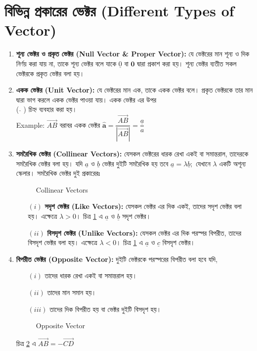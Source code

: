 \section*{বিভিন্ন প্রকারের ভেক্টর (Different Types of Vector)}
\begin{enumerate}
	\item \textbf{শূন্য ভেক্টর ও প্রকৃত ভেক্টর (Null Vector \& Proper Vector):} যে ভেক্টরের মান শূন্য ও দিক নির্ণয় করা যায় না, তাকে শূন্য ভেক্টর বলে যাকে $\underline{0}$ বা $\mathbf{0}$ দ্বারা প্রকাশ করা হয়। শূন্য ভেক্টর ব্যতীত সকল ভেক্টরকে প্রকৃত ভেক্টর বলা হয়। 
	
	\item \textbf{একক ভেক্টর (Unit Vector):} যে ভেক্টরের মান এক, তাকে একক ভেক্টর বলে। প্রকৃত ভেক্টরকে তার মান দ্বারা ভাগ করলে একক ভেক্টর পাওয়া যায়। একক ভেক্টর এর উপর \\( $\hat{}$ ) চিহ্ন ব্যবহার করা হয়। \\ Example: $\overrightarrow{AB}$ বরাবর একক ভেক্টর $\hat{\pmb{a}}=\dfrac{\overrightarrow{AB}}{|\overrightarrow{AB}|}=\dfrac{\underline{a}}{a}$
	
	\item \textbf{সমরৈখিক ভেক্টর (Collinear Vectors):} যেসকল ভেক্টরের ধারক রেখা একই বা সমান্তরাল, তাদেরকে সমরৈখিক ভেক্টর বলা হয়। যদি $\underline{a}$ ও $\underline{b}$ ভেক্টর দুইটি সমরৈখিক হয় তবে $\underline{a}=\lambda\underline{b};$ যেখানে $\lambda$ একটি অশূন্য স্কেলার। সমরৈখিক ভেক্টর দুই প্রকারেরঃ
	\begin{figure}[h]
		\centering
		
		\caption{Collinear Vectors}
		\label{vec-fig-3}
	\end{figure} 
	\begin{itemize}
		\item[$(i)$] \textbf{সদৃশ ভেক্টর (Like Vectors):} যেসকল ভেক্টর এর দিক একই, তাদের সদৃশ ভেক্টর বলা হয়। এক্ষেত্রে $\lambda>0$। চিত্র \ref{vec-fig-3} এ $\underline{a}$ ও $\underline{b}$ সদৃশ ভেক্টর। 
		
		\item[$(ii)$] \textbf{বিসদৃশ ভেক্টর (Unlike Vectors):} যেসকল ভেক্টর এর দিক পরস্পর বিপরীত, তাদের বিসদৃশ ভেক্টর বলা হয়। এক্ষেত্রে $\lambda<0$।  চিত্র \ref{vec-fig-3} এ $\underline{a}$ ও $\underline{c}$ বিসদৃশ ভেক্টর। 
	\end{itemize} 
	
	
	\item \textbf{বিপরীত ভেক্টর (Opposite Vector):} দুইটি ভেক্টরকে পরস্পরের বিপরীত বলা হবে যদি, 
	\begin{itemize}
		\item[$(i)$] তাদের ধারক রেখা একই বা সমান্তরাল হয়। 
		\item[$(ii)$] তাদের মান সমান হয়। 
		\item[$(iii)$] তাদের দিক বিপরীত হয় বা ভেক্টর দুইটি বিসদৃশ হয়। 
	\end{itemize}
	\begin{figure}[h]
		\centering
		
		\caption{Opposite Vector}
		\label{vec-fig-4}
	\end{figure}
	চিত্র \ref{vec-fig-4} এ $\overrightarrow{AB}=-\overrightarrow{CD}$
	

\end{enumerate}
